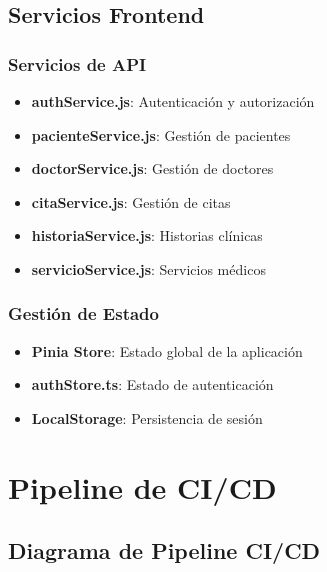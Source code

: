 \documentclass[12pt,a4paper]{article}
\begin{document}
\subsection{Servicios Frontend}

\subsubsection{Servicios de API}
\begin{itemize}
    \item \textbf{authService.js}: Autenticación y autorización
    \item \textbf{pacienteService.js}: Gestión de pacientes
    \item \textbf{doctorService.js}: Gestión de doctores
    \item \textbf{citaService.js}: Gestión de citas
    \item \textbf{historiaService.js}: Historias clínicas
    \item \textbf{servicioService.js}: Servicios médicos
\end{itemize}

\subsubsection{Gestión de Estado}
\begin{itemize}
    \item \textbf{Pinia Store}: Estado global de la aplicación
    \item \textbf{authStore.ts}: Estado de autenticación
    \item \textbf{LocalStorage}: Persistencia de sesión
\end{itemize}

\section{Pipeline de CI/CD}

\subsection{Diagrama de Pipeline CI/CD}
\end{document}
